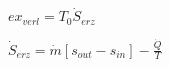 \( ex_{verl} = T_0 \dot{S}_{erz} \)  

\( \dot{S}_{erz} = \dot{m} \left[ s_{out} - s_{in} \right] - \frac{\dot{Q}}{T} \)